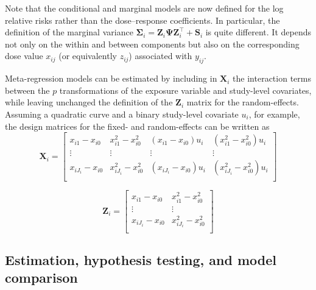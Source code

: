 \documentclass[11pt,a4paper,twoside,openany]{book}\usepackage{knitr}
\begin{document}
{{\noindent Note that the conditional and marginal models are now defined for the log relative risks rather than the dose--response coefficients. In particular, the definition of the marginal variance $\boldsymbol{\Sigma}_i  = \mathbf{Z}_{i} \boldsymbol{\Psi} \mathbf{Z}_{i}^\top  + \mathbf{S}_i$ is quite different. It depends not only on the within and between components but also on the corresponding dose value $x_{ij}$ (or equivalently $z_{ij}$) associated with $y_{ij}$.

Meta-regression models can be estimated by including in $\mathbf{X}_{i}$ the interaction terms between the $p$ transformations of the exposure variable and study-level covariates, while leaving unchanged the definition of the $\mathbf{Z}_{i}$ matrix for the random-effects. Assuming a quadratic curve and a binary study-level covariate $u_i$, for example, the design matrices for the fixed- and random-effects can be written as
\begin{equation*}
\mathbf{X}_i =
	\begin{bmatrix}
		x_{i1} - x_{i0}  & x_{i1}^2 - x_{i0}^2 & \left(x_{i1} - x_{i0}\right) u_i &  \left( x_{i1}^2 - x_{i0}^2\right) u_i \\
		\vdots & \vdots & \vdots & \vdots \\
		x_{iJ_i} - x_{i0}  & x_{iJ_i}^2 - x_{i0}^2 & \left(x_{iJ_i} - x_{i0}\right) u_i  & \left(x_{iJ_i}^2 - x_{i0}^2\right) u_i \\
	\end{bmatrix}
\end{equation*} 

\begin{equation*}
\mathbf{Z}_i =
	\begin{bmatrix}
		x_{i1} - x_{i0}  & x_{i1}^2 - x_{i0}^2 \\
		\vdots & \vdots \\
		x_{iJ_i} - x_{i0}  & x_{iJ_i}^2 - x_{i0}^2 \\
	\end{bmatrix}
\end{equation*} 

\subsection{Estimation, hypothesis testing, and model comparison}

}}
\end{document}
